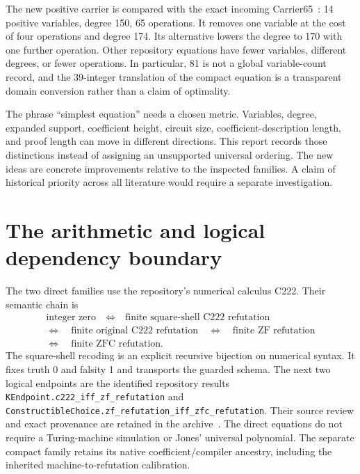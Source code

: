 \documentclass[10pt,letterpaper]{article}
\theoremstyle{remark}\newtheorem{remark}[theorem]{Remark}
\newcommand{\pathtext}[1]{\nolinkurl{#1}}
\begin{document}
The new positive carrier is compared with the exact incoming Carrier65~\cite{carrier}:
14 positive variables, degree 150, 65 operations. It removes one variable
at the cost of four operations and degree 174. Its alternative lowers the
degree to 170 with one further operation. Other repository equations have
fewer variables, different degrees, or fewer operations. In particular,
81 is not a global variable-count record, and the 39-integer translation
of the compact equation is a transparent domain conversion rather than
a claim of optimality.

The phrase ``simplest equation'' needs a chosen metric. Variables, degree,
expanded support, coefficient height, circuit size, coefficient-description
length, and proof length can move in different directions. This report
records those distinctions instead of assigning an unsupported universal
ordering. The new ideas are concrete improvements relative to the inspected
families. A claim of historical priority across all literature would require
a separate investigation.

\section{The arithmetic and logical dependency boundary}\label{sec:calibration}

The two direct families use the repository's numerical calculus C222.
Their semantic chain is
\[
\begin{gathered}
\text{integer zero}\quad\Longleftrightarrow\quad
\text{finite square-shell C222 refutation}\\
\Longleftrightarrow\quad\text{finite original C222 refutation}
\quad\Longleftrightarrow\quad\text{finite ZF refutation}\\
\Longleftrightarrow\quad\text{finite ZFC refutation}.
\end{gathered}
\]
The square-shell recoding is an explicit recursive bijection on numerical
syntax. It fixes truth 0 and falsity 1 and transports the guarded schema.
The next two logical endpoints are the identified repository results
\pathtext{KEndpoint.c222_iff_zf_refutation} and
\pathtext{ConstructibleChoice.zf_refutation_iff_zfc_refutation}.
Their source review and exact provenance are retained in the archive~\cite{calibration}.
The direct equations do not require a Turing-machine simulation or Jones'
universal polynomial. The separate compact family retains its native
coefficient/compiler ancestry, including the inherited machine-to-refutation
calibration.
\end{document}

